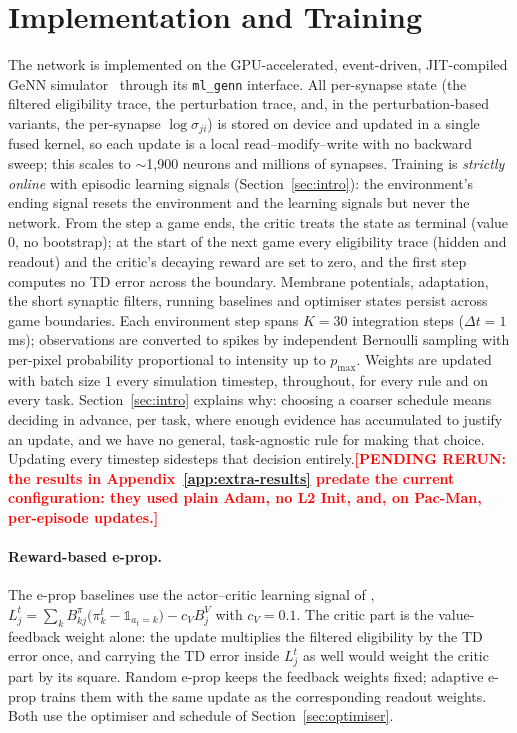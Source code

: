 \documentclass[10pt,twocolumn]{article}
\newcommand{\pending}[1]{\textcolor{red}{\bfseries[PENDING RERUN#1]}}
\begin{document}
\section{Implementation and Training}
\label{app:impl}
The network is implemented on the GPU-accelerated, event-driven, JIT-compiled
GeNN simulator~\citep{Yavuz2016GeNN} through its \texttt{ml\_genn} interface. All
per-synapse state (the filtered eligibility trace, the perturbation trace, and,
in the perturbation-based variants, the per-synapse $\log\sigma_{ji}$) is stored on
device and updated in a single fused kernel, so each update is a local
read--modify--write with no backward sweep; this scales to $\sim$1{,}900 neurons
and millions of synapses. Training is \emph{strictly online} with episodic learning signals
(Section~\ref{sec:intro}): the environment's ending signal resets the
environment and the learning signals but never the network. From the step a
game ends, the critic treats the state as terminal (value $0$, no bootstrap);
at the start of the next game every eligibility trace (hidden and readout) and
the critic's decaying reward are set to zero, and the first step computes no TD
error across the boundary. Membrane potentials, adaptation, the short synaptic
filters, running baselines and optimiser states persist across game boundaries. Each environment step
spans $K=30$ integration steps ($\Delta t = 1$\,ms); observations are converted
to spikes by independent Bernoulli sampling with per-pixel probability
proportional to intensity up to $p_{\max}$. Weights are updated with batch size
$1$ every simulation timestep, throughout, for every rule and on every task.
Section~\ref{sec:intro} explains why: choosing a coarser schedule means
deciding in advance, per task, where enough evidence has accumulated to
justify an update, and we have no general, task-agnostic rule for making that
choice. Updating every timestep sidesteps that decision
entirely.\pending{: the results in Appendix~\ref{app:extra-results} predate
the current configuration: they used plain Adam, no L2 Init, and, on Pac-Man,
per-episode updates.}

\paragraph{Reward-based e-prop.}
The e-prop baselines use the actor--critic learning signal of \citet{eprop2020},
$L^t_j=\sum_k B^\pi_{kj}\big(\pi^t_k-\mathbb{1}_{a_t=k}\big)-c_V B^V_j$ with $c_V=0.1$.
The critic part is the value-feedback weight alone: the update multiplies the filtered
eligibility by the TD error once, and carrying the TD error inside $L^t_j$ as well would
weight the critic part by its square. Random e-prop keeps the feedback weights fixed;
adaptive e-prop trains them with the same update as the corresponding readout weights.
Both use the optimiser and schedule of Section~\ref{sec:optimiser}.
\end{document}
